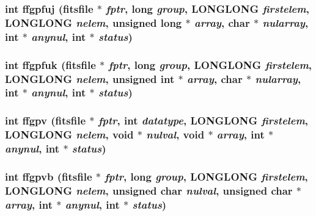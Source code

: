 \subsubsection{\setlength{\rightskip}{0pt plus 5cm}int ffgpfuj (\bf{fitsfile} $\ast$ {\em fptr}, long {\em group}, \bf{LONGLONG} {\em firstelem}, \bf{LONGLONG} {\em nelem}, unsigned long $\ast$ {\em array}, char $\ast$ {\em nularray}, int $\ast$ {\em anynul}, int $\ast$ {\em status})}\label{test_2roimasker_2fitsio_8h_45489521b50ea72a1b13a57a1bdc6180}


\subsubsection{\setlength{\rightskip}{0pt plus 5cm}int ffgpfuk (\bf{fitsfile} $\ast$ {\em fptr}, long {\em group}, \bf{LONGLONG} {\em firstelem}, \bf{LONGLONG} {\em nelem}, unsigned int $\ast$ {\em array}, char $\ast$ {\em nularray}, int $\ast$ {\em anynul}, int $\ast$ {\em status})}\label{test_2roimasker_2fitsio_8h_e184edd1d62907a447c3bce7618b8c57}


\subsubsection{\setlength{\rightskip}{0pt plus 5cm}int ffgpv (\bf{fitsfile} $\ast$ {\em fptr}, int {\em datatype}, \bf{LONGLONG} {\em firstelem}, \bf{LONGLONG} {\em nelem}, void $\ast$ {\em nulval}, void $\ast$ {\em array}, int $\ast$ {\em anynul}, int $\ast$ {\em status})}\label{test_2roimasker_2fitsio_8h_0c3f5323e0fb6305fff345b94fb767e7}


\subsubsection{\setlength{\rightskip}{0pt plus 5cm}int ffgpvb (\bf{fitsfile} $\ast$ {\em fptr}, long {\em group}, \bf{LONGLONG} {\em firstelem}, \bf{LONGLONG} {\em nelem}, unsigned char {\em nulval}, unsigned char $\ast$ {\em array}, int $\ast$ {\em anynul}, int $\ast$ {\em status})}\label{test_2roimasker_2fitsio_8h_8e74e883f394026b322166c514e89737}


